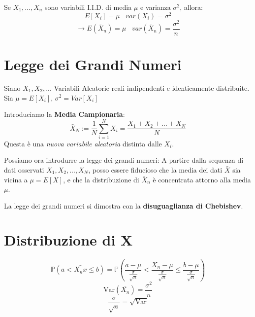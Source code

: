 Se $X_1,...,X_n$ sono variabili I.I.D. di media $\mu$ e varianza $\sigma^2$, allora:
\[ E[X_i] = \mu \;\;\; var(X_i) = \sigma^2 \]
\[ \to E(\bar{X}_n) = \mu  \;\;\; var(\bar{X}_n) = \frac{\sigma^2}{n} \]


\section{Legge dei Grandi Numeri}
Siano $X_1,X_2,...$ Variabili Aleatorie reali indipendenti e identicamente distribuite.
\\Sia $\mu = E[X_i]$, $\sigma^2 = Var[X_i]$

Introduciamo la \textbf{Media Campionaria}:
\[ \bar{X}_N  := \frac{1}{N} \sum_{i=1}^N X_i = \frac{X_1+X_2+ ... + X_N}{N}\]
Questa è una \emph{nuova variabile aleatoria} distinta dalle $X_i$.

Possiamo ora introdurre la legge dei grandi numeri:
A partire dalla sequenza di dati osservati $X_1,X_2,...,X_N$, posso essere fiducioso che la media dei dati
$\bar{X}$ sia vicina a $\mu = E[X]$, e che la distribuzione di $\bar{X}_n$ è concentrata attorno alla media $\mu$.


La legge dei grandi numeri si dimostra con la \textbf{disuguaglianza di Chebishev}.

\section{Distribuzione di X}
\begin{equation*}
    \mathbb{P} (a  < \bar{X_nx} \leq b) = \mathbb{P} (\frac{a - \mu}{\frac{\sigma}{\sqrt{n}}} 
    < \frac{X_n - \mu}{\frac{\sigma}{\sqrt{n}}} \leq \frac{b - \mu}{\frac{\sigma}{\sqrt{n}}})   
\end{equation*}
\begin{equation*}
    \text{Var}(\bar{X_n}) = \frac{\sigma ^ 2}{n} 
\end{equation*}
\begin{equation*}
    \frac{\sigma}{\sqrt{n}} = \sqrt{\text{Var}}
\end{equation*}

